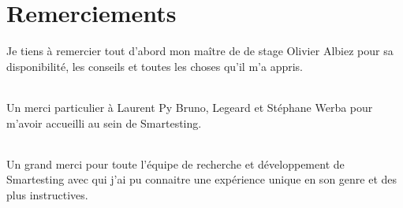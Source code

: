 \chapter*{Remerciements}

Je tiens à remercier tout d'abord mon maître de de stage Olivier Albiez pour sa disponibilité, les conseils et toutes les choses qu'il m'a appris.

\subparagraph*{}
Un merci particulier à Laurent Py Bruno, Legeard et Stéphane Werba pour m'avoir accueilli au sein de Smartesting.

\subparagraph*{}
Un grand merci pour toute l'équipe de recherche et développement de Smartesting avec qui j'ai pu connaitre une expérience unique en son genre et des plus instructives.

